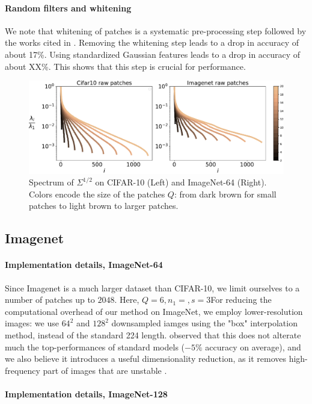 \documentclass{article}
\begin{document}
{\paragraph{Random filters and whitening} We note that whitening of patches is a systematic pre-processing step followed by the works cited in \cite{}.
Removing the whitening step leads to a drop in accuracy of about 17\%.
Using standardized Gaussian features leads to a drop in accuracy of about XX\%. This shows that this step is crucial for performance.


\begin{figure}
  \includegraphics[width=1.\linewidth]{figures/spectrum_patches}
  \caption{Spectrum of $\Sigma^{1/2}$ on CIFAR-10 (Left) and ImageNet-64 (Right).\label{spectrum} Colors encode the size of the patches $Q$: from dark brown for small patches to light brown to larger patches.}
\end{figure}
\subsection{Imagenet}

\paragraph{Implementation details, ImageNet-64}  Since Imagenet is a much larger dataset than CIFAR-10, we limit ourselves to a number of patches up to $2048$. Here, $Q=6, n_1=, s=3$For reducing the computational overhead of our method on ImageNet, we employ lower-resolution images: we use $64^2$ and $128^2$ downsampled iamges using the "box" interpolation method, instead of the standard 224 length.  \cite{DBLP:journals/corr/ChrabaszczLH17} observed that this does not alterate much the top-performances of standard models ($-5 \%$ accuracy on average), and we also believe it introduces a useful dimensionality reduction, as it removes high-frequency part of images that are unstable \citet{chjdq}.

\paragraph{Implementation details, ImageNet-128}

}
\end{document}
